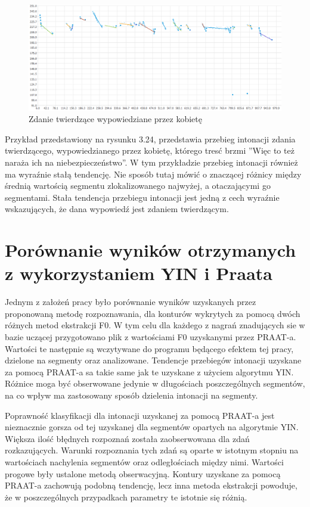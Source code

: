 \documentclass[a4paper,12 pt]{report}
\begin{document}
\begin{figure}[h]
\centering
\includegraphics[scale=0.6]{twierdzenie_3_kobieta.png}
\caption{Zdanie twierdzące wypowiedziane przez kobietę}
\end{figure}
 
Przykład przedstawiony na rysunku 3.24, przedstawia przebieg intonacji zdania twierdzącego, wypowiedzianego przez kobietę, którego tresć brzmi ''Więc to też naraża ich na niebezpieczeństwo''. W tym przykładzie przebieg intonacji również ma wyraźnie stałą tendencję. Nie sposób tutaj mówić o znaczącej różnicy między średnią wartością segmentu zlokalizowanego najwyżej, a otaczającymi go segmentami. Stała tendencja przebiegu intonacji jest jedną z cech wyraźnie wskazujących, że dana wypowiedź jest zdaniem twierdzącym.

 
\section{Porównanie wyników otrzymanych z wykorzystaniem YIN i Praata}
Jednym z założeń pracy było porównanie wyników uzyskanych przez proponowaną metodę rozpoznawania, dla konturów wykrytych za pomocą dwóch różnych metod ekstrakcji F0. W tym celu dla każdego z nagrań znadujących sie w bazie uczącej przygotowano plik z wartościami F0 uzyskanymi przez PRAAT-a. Wartości te następnie są wczytywane do programu będącego efektem tej pracy, dzielone na segmenty oraz analizowane.
Tendencje przebiegów intonacji uzyskane za pomocą PRAAT-a sa takie same jak te uzyskane z użyciem algorytmu YIN. Różnice moga być obserwowane jedynie w długościach poszczególnych segmentów, na co wpływ ma zastosowany sposób dzielenia intonacji na segmenty.


Poprawność klasyfikacji dla intonacji uzyskanej za pomocą PRAAT-a jest nieznacznie gorsza od tej uzyskanej dla segmentów opartych na algorytmie YIN. Większa ilość błędnych rozpoznań została zaobserwowana dla zdań rozkazujących. Warunki rozpoznania tych zdań są oparte w istotnym stopniu na wartościach nachylenia segmentów oraz odległościach między nimi. Wartości progowe były ustalone metodą obserwacyjną. Kontury uzyskane za pomocą PRAAT-a zachowują podobną tendencję, lecz inna metoda ekstrakcji powoduje, że w poszczególnych przypadkach parametry te istotnie się różnią.
\end{document}
